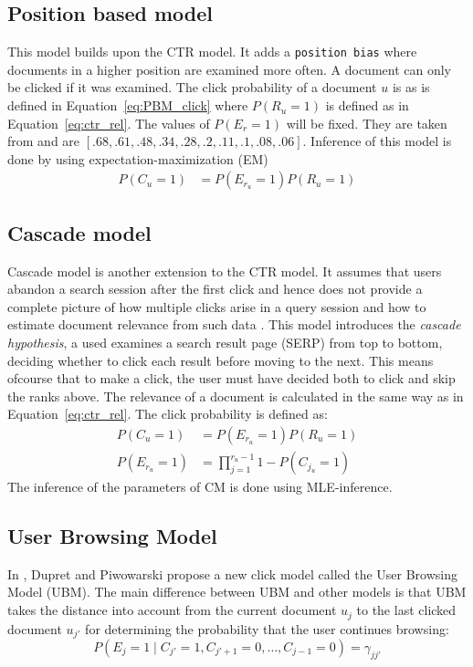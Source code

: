 \subsection{Position based model}
This model builds upon the CTR model. It adds a \texttt{position bias} where documents in a higher position are examined more often. A document can only be clicked if it was examined. The click probability of a document $u$ is as is defined in Equation~\ref{eq:PBM_click} where $P(R_u=1)$ is defined as in Equation~\ref{eq:ctr_rel}. The values of $P(E_r=1)$ will be fixed. They are taken from \cite{eye_track} and are $[.68, .61, .48, .34, .28, .2, .11, .1, .08, .06]$. Inference of this model is done by using expectation-maximization (EM)
\begin{align}
	P(C_{u}=1) &= P(E_{r_u}=1)P(R_u=1) \label{eq:PBM_click}
\end{align}

\subsection{Cascade model}
Cascade model is another extension to the CTR model. It assumes that users abandon a search session after the first click and hence does not provide a complete picture of how multiple clicks arise in a query session and how to estimate document relevance from such data \cite{Kempe2008, Craswell2008}. This model introduces the \textit{cascade hypothesis}, a used examines a search result page (SERP) from top to bottom, deciding whether to click each result before moving to the next. This means ofcourse that to make a click, the user must have decided both to click and skip the ranks above. The relevance of a document is calculated in the same way as in Equation~\ref{eq:ctr_rel}. The click probability is defined as:
\begin{align}
	P(C_{u}=1) &= P(E_{r_u}=1)P(R_u=1) \label{eq:CM_click} \\
	P(E_{r_u}=1) &= \prod_{j=1}^{r_u-1} 1 - P(C_{j_u}=1) \nonumber
\end{align}
The inference of the parameters of CM is done using MLE-inference.

\subsection{User Browsing Model}
In \cite{Dupret2008}, Dupret and Piwowarski propose a new click model called the User Browsing Model (UBM). The main difference between UBM and other models is that UBM takes the distance into account from the current document \(u_j\) to the last clicked document \(u_{j'}\) for determining the probability that the user continues browsing:
\[P(E_j =1 \mid C_{j'}=1, C_{j'+1}=0, \dots, C_{j-1}=0) = \gamma_{jj'}\]


